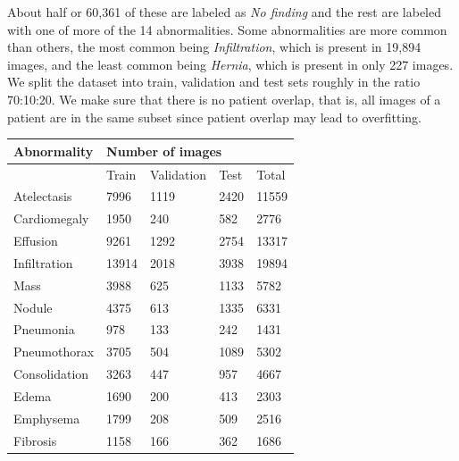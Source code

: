 \documentclass[12pt,oneside,a4paper]{report}
\begin{document}
About half or 60,361 of these are labeled as \emph{No finding} and the rest are
labeled with one of more of the 14 abnormalities. Some abnormalities are more
common than others, the most common being \emph{Infiltration}, which is present
in 19,894 images, and the least common being \emph{Hernia}, which is present in
only 227 images.\\

We split the dataset into train, validation and test sets roughly in the ratio
70:10:20. We make sure that there is no patient overlap, that is, all images of
a patient are in the same subset since patient overlap may lead to overfitting.

\begin{table}[]
  \centering
  \begin{tabular}{@{}lllll@{}}
    \toprule
    \textbf{Abnormality} & \multicolumn{4}{l}{\textbf{Number of images}}        \\ \midrule
                         & Train     & Validation & Test      & Total           \\ \midrule
    Atelectasis          & 7996      & 1119       & 2420      & 11559           \\ \midrule
    Cardiomegaly         & 1950      & 240        & 582       & 2776            \\ \midrule
    Effusion             & 9261      & 1292       & 2754      & 13317           \\ \midrule
    Infiltration         & 13914     & 2018       & 3938      & 19894           \\ \midrule
    Mass                 & 3988      & 625        & 1133      & 5782            \\ \midrule
    Nodule               & 4375      & 613        & 1335      & 6331            \\ \midrule
    Pneumonia            & 978       & 133        & 242       & 1431            \\ \midrule
    Pneumothorax         & 3705      & 504        & 1089      & 5302            \\ \midrule
    Consolidation        & 3263      & 447        & 957       & 4667            \\ \midrule
    Edema                & 1690      & 200        & 413       & 2303            \\ \midrule
    Emphysema            & 1799      & 208        & 509       & 2516            \\ \midrule
    Fibrosis             & 1158      & 166        & 362       & 1686            \\ \midrule

\end{tabular}
\end{table}
\end{document}
